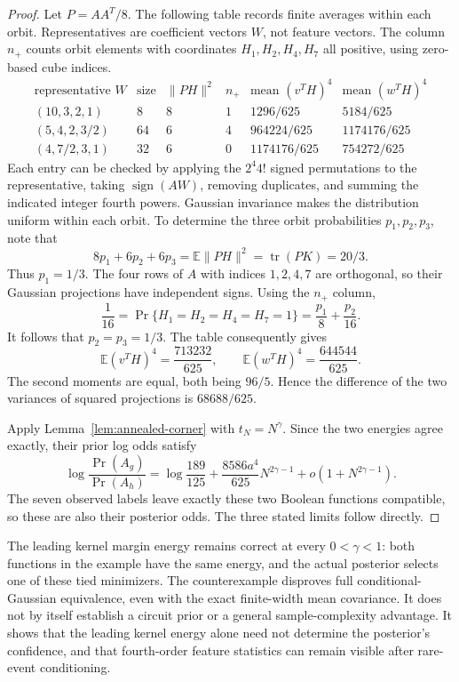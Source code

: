 \begin{proof}
Let $P=AA^T/8$. The following table records finite averages within
each orbit. Representatives are coefficient vectors $W$, not feature
vectors. The column $n_+$ counts orbit elements with coordinates
$H_1,H_2,H_4,H_7$ all positive, using zero-based cube indices.
\[
\begin{array}{c|r|r|r|r|r}
 \text{representative }W&\text{size}&\|PH\|^2&n_+
 &\text{mean }(v^TH)^4&\text{mean }(w^TH)^4\\ \hline
 (10,3,2,1)&8&8&1&1296/625&5184/625\\
 (5,4,2,3/2)&64&6&4&964224/625&1174176/625\\
 (4,7/2,3,1)&32&6&0&1174176/625&754272/625
\end{array}
\]
Each entry can be checked by applying the $2^4 4!$ signed
permutations to the representative, taking $\operatorname{sign}(AW)$,
removing duplicates, and summing the indicated integer fourth powers.
Gaussian invariance makes the distribution uniform within each orbit.
To determine the three orbit probabilities $p_1,p_2,p_3$, note that
\[
 8p_1+6p_2+6p_3
       =\mathbb E\|PH\|^2=\operatorname{tr}(PK)=20/3.
\]
Thus $p_1=1/3$. The four rows of $A$ with indices $1,2,4,7$ are
orthogonal, so their Gaussian projections have independent signs.
Using the $n_+$ column,
\[
 \frac1{16}=\Pr\{H_1=H_2=H_4=H_7=1\}
            =\frac{p_1}{8}+\frac{p_2}{16}.
\]
It follows that $p_2=p_3=1/3$. The table consequently gives
\[
 \mathbb E(v^TH)^4=\frac{713232}{625},\qquad
 \mathbb E(w^TH)^4=\frac{644544}{625}.
\]
The second moments are equal, both being $96/5$. Hence the difference
of the two variances of squared projections is $68688/625$.

Apply Lemma~\ref{lem:annealed-corner} with $t_N=N^\gamma$.
Since the two energies agree exactly, their prior log odds satisfy
\[
 \log\frac{\Pr(A_g)}{\Pr(A_h)}
 =\log\frac{189}{125}
    +\frac{8586a^4}{625}N^{2\gamma-1}
    +o(1+N^{2\gamma-1}).
\]
The seven observed labels leave exactly these two Boolean functions
compatible, so these are also their posterior odds. The three stated
limits follow directly.
\end{proof}

\begin{remark}
The leading kernel margin energy remains correct at every
$0<\gamma<1$: both functions in the example have the same energy, and
the actual posterior selects one of these tied minimizers. The
counterexample disproves full conditional-Gaussian equivalence, even
with the exact finite-width mean covariance. It does not by itself
establish a circuit prior or a general sample-complexity advantage.
It shows that the leading kernel energy alone need not determine the
posterior's confidence, and that fourth-order feature statistics can
remain visible after rare-event conditioning.
\end{remark}
